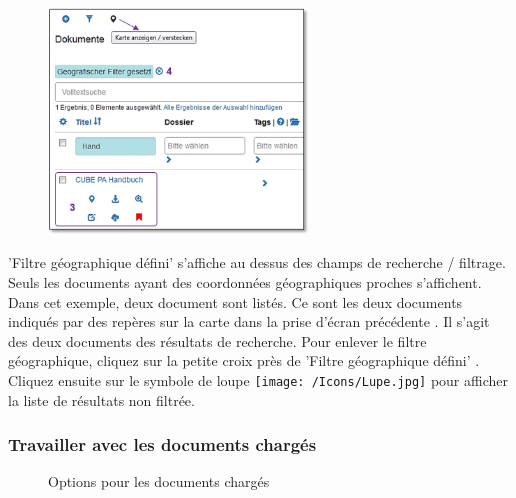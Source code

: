 \begin{figure}
  \vspace{-25pt}
  \begin{center}
    \includegraphics[height=60mm]{../chapters/11_Dokumentenablage/pictures/11-2-3_GeoBereichResult.jpg}
  \end{center}
  \vspace{-20pt}
  \vspace{-10pt}
\end{figure}
'Filtre géographique défini' s'affiche au dessus des champs de recherche / filtrage. Seuls les documents ayant des coordonnées géographiques proches s'affichent. Dans cet exemple, deux document sont listés. Ce sont les deux documents indiqués par des repères sur la carte dans la prise d'écran précédente . Il s'agit des deux documents des résultats de recherche. Pour enlever le filtre géographique, cliquez sur la petite croix près de 'Filtre géographique défini' . Cliquez ensuite sur le symbole de loupe \texttt{[image: /Icons/Lupe.jpg]} pour afficher la liste de résultats non filtrée.


\subsubsection{Travailler avec les documents chargés}
\label{bkm:Ref442801819}

\begin{figure}[H]
\caption{Options pour les documents chargés}
\end{figure}

